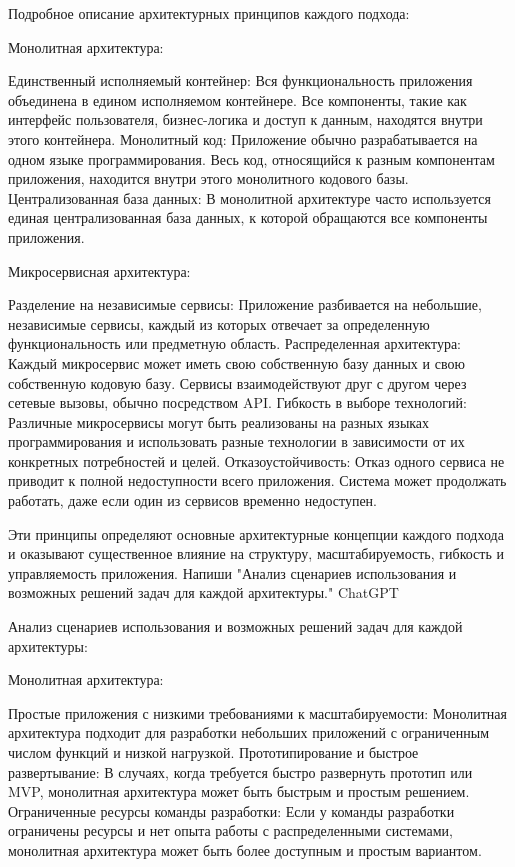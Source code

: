 Подробное описание архитектурных принципов каждого подхода:

Монолитная архитектура:

    Единственный исполняемый контейнер: Вся функциональность приложения объединена в едином исполняемом контейнере. Все компоненты, такие как интерфейс пользователя, бизнес-логика и доступ к данным, находятся внутри этого контейнера.
    Монолитный код: Приложение обычно разрабатывается на одном языке программирования. Весь код, относящийся к разным компонентам приложения, находится внутри этого монолитного кодового базы.
    Централизованная база данных: В монолитной архитектуре часто используется единая централизованная база данных, к которой обращаются все компоненты приложения.

Микросервисная архитектура:

    Разделение на независимые сервисы: Приложение разбивается на небольшие, независимые сервисы, каждый из которых отвечает за определенную функциональность или предметную область.
    Распределенная архитектура: Каждый микросервис может иметь свою собственную базу данных и свою собственную кодовую базу. Сервисы взаимодействуют друг с другом через сетевые вызовы, обычно посредством API.
    Гибкость в выборе технологий: Различные микросервисы могут быть реализованы на разных языках программирования и использовать разные технологии в зависимости от их конкретных потребностей и целей.
    Отказоустойчивость: Отказ одного сервиса не приводит к полной недоступности всего приложения. Система может продолжать работать, даже если один из сервисов временно недоступен.

Эти принципы определяют основные архитектурные концепции каждого подхода и оказывают существенное влияние на структуру, масштабируемость, гибкость и управляемость приложения.
Напиши "Анализ сценариев использования и возможных решений задач для каждой архитектуры."
ChatGPT

Анализ сценариев использования и возможных решений задач для каждой архитектуры:

Монолитная архитектура:

    Простые приложения с низкими требованиями к масштабируемости: Монолитная архитектура подходит для разработки небольших приложений с ограниченным числом функций и низкой нагрузкой.
    Прототипирование и быстрое развертывание: В случаях, когда требуется быстро развернуть прототип или MVP, монолитная архитектура может быть быстрым и простым решением.
    Ограниченные ресурсы команды разработки: Если у команды разработки ограничены ресурсы и нет опыта работы с распределенными системами, монолитная архитектура может быть более доступным и простым вариантом.

